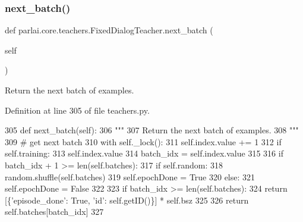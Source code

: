 \subsubsection{\texorpdfstring{next\+\_\+batch()}{next\_batch()}}
{\footnotesize\ttfamily def parlai.\+core.\+teachers.\+Fixed\+Dialog\+Teacher.\+next\+\_\+batch (\begin{DoxyParamCaption}\item[{}]{self }\end{DoxyParamCaption})}

\begin{DoxyVerb}Return the next batch of examples.
\end{DoxyVerb}
 

Definition at line 305 of file teachers.\+py.


\begin{DoxyCode}
305     \textcolor{keyword}{def }next\_batch(self):
306         \textcolor{stringliteral}{"""}
307 \textcolor{stringliteral}{        Return the next batch of examples.}
308 \textcolor{stringliteral}{        """}
309         \textcolor{comment}{# get next batch}
310         with self.\_lock():
311             self.index.value += 1
312             \textcolor{keywordflow}{if} self.training:
313                 self.index.value %
314             batch\_idx = self.index.value
315 
316             \textcolor{keywordflow}{if} batch\_idx + 1 >= len(self.batches):
317                 \textcolor{keywordflow}{if} self.random:
318                     random.shuffle(self.batches)
319                 self.epochDone = \textcolor{keyword}{True}
320             \textcolor{keywordflow}{else}:
321                 self.epochDone = \textcolor{keyword}{False}
322 
323         \textcolor{keywordflow}{if} batch\_idx >= len(self.batches):
324             \textcolor{keywordflow}{return} [\{\textcolor{stringliteral}{'episode\_done'}: \textcolor{keyword}{True}, \textcolor{stringliteral}{'id'}: self.getID()\}] * self.bsz
325 
326         \textcolor{keywordflow}{return} self.batches[batch\_idx]
327 
\end{DoxyCode}
\mbox{\label{classparlai_1_1core_1_1teachers_1_1FixedDialogTeacher_a7fccfc09aef3510f8bb9834398eff8e9}} 
